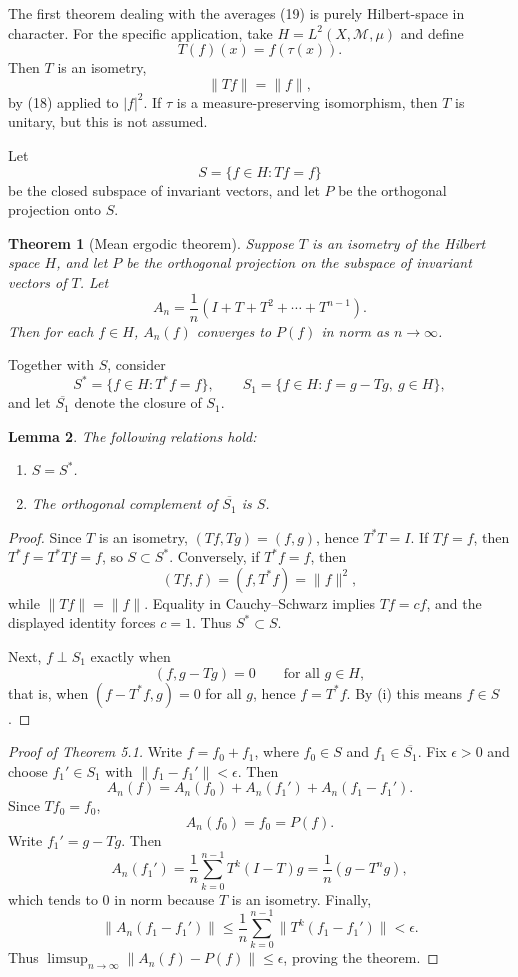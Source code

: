 \documentclass[11pt,openany]{book}
\newtheorem{theorem}{Theorem}[section]
\newtheorem{lemma}[theorem]{Lemma}
\begin{document}
The first theorem dealing with the averages (19) is purely Hilbert-space in character. For the specific application, take $H=L^2(X,\mathcal M,\mu)$ and define
\begin{equation}
T(f)(x)=f(\tau(x)).
\tag{20}
\end{equation}
Then $T$ is an isometry,
\begin{equation}
\|Tf\|=\|f\|,
\tag{21}
\end{equation}
by (18) applied to $|f|^2$. If $\tau$ is a measure-preserving isomorphism, then $T$ is unitary, but this is not assumed.

Let
\[
S=\{f\in H:Tf=f\}
\]
be the closed subspace of invariant vectors, and let $P$ be the orthogonal projection onto $S$.

\begin{theorem}[Mean ergodic theorem]
Suppose $T$ is an isometry of the Hilbert space $H$, and let $P$ be the orthogonal projection on the subspace of invariant vectors of $T$. Let
\[
A_n=\frac1n(I+T+T^2+\cdots+T^{n-1}).
\]
Then for each $f\in H$, $A_n(f)$ converges to $P(f)$ in norm as $n\to\infty$.
\end{theorem}

Together with $S$, consider
\[
S^*=\{f\in H:T^*f=f\},
\qquad
S_1=\{f\in H:f=g-Tg,\ g\in H\},
\]
and let $\overline{S_1}$ denote the closure of $S_1$.

\begin{lemma}
The following relations hold:
\begin{enumerate}
\item[(i)] $S=S^*$.
\item[(ii)] The orthogonal complement of $\overline{S_1}$ is $S$.
\end{enumerate}
\end{lemma}

\begin{proof}
Since $T$ is an isometry, $(Tf,Tg)=(f,g)$, hence $T^*T=I$. If $Tf=f$, then $T^*f=T^*Tf=f$, so $S\subset S^*$. Conversely, if $T^*f=f$, then
\[
(Tf,f)=(f,T^*f)=\|f\|^2,
\]
while $\|Tf\|=\|f\|$. Equality in Cauchy--Schwarz implies $Tf=cf$, and the displayed identity forces $c=1$. Thus $S^*\subset S$.

Next, $f\perp S_1$ exactly when
\[
(f,g-Tg)=0\qquad\text{for all }g\in H,
\]
that is, when $(f-T^*f,g)=0$ for all $g$, hence $f=T^*f$. By (i) this means $f\in S$.
\end{proof}

\begin{proof}[Proof of Theorem 5.1]
Write $f=f_0+f_1$, where $f_0\in S$ and $f_1\in\overline{S_1}$. Fix $\epsilon>0$ and choose $f_1'\in S_1$ with $\|f_1-f_1'\|<\epsilon$. Then
\begin{equation}
A_n(f)=A_n(f_0)+A_n(f_1')+A_n(f_1-f_1').
\tag{22}
\end{equation}
Since $Tf_0=f_0$,
\[
A_n(f_0)=f_0=P(f).
\]
Write $f_1'=g-Tg$. Then
\[
A_n(f_1')
=\frac1n\sum_{k=0}^{n-1}T^k(I-T)g
=\frac1n(g-T^ng),
\]
which tends to $0$ in norm because $T$ is an isometry. Finally,
\[
\|A_n(f_1-f_1')\|
\leq\frac1n\sum_{k=0}^{n-1}\|T^k(f_1-f_1')\|
<\epsilon.
\]
Thus $\limsup_{n\to\infty}\|A_n(f)-P(f)\|\leq\epsilon$, proving the theorem.
\end{proof}
\end{document}
